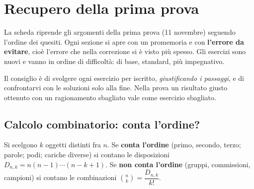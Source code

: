 \renewcommand{\thechapter}{R1}
\chapter{Recupero della prima prova}
\renewcommand{\thesection}{\arabic{section}}

\begin{vuoto}{}
La scheda riprende gli argomenti della prima prova (11 novembre) seguendo l'ordine dei quesiti. Ogni sezione si apre con un promemoria e con \textbf{l'errore da evitare}, cioè l'errore che nella correzione si è visto più spesso. Gli esercizi sono nuovi e vanno in ordine di difficoltà:  di base,  standard,  più impegnativo.

Il consiglio è di svolgere ogni esercizio per iscritto, \emph{giustificando i passaggi}, e di confrontarvi con le soluzioni solo alla fine. Nella prova un risultato giusto ottenuto con un ragionamento sbagliato vale come esercizio sbagliato.
\end{vuoto}

\section{Calcolo combinatorio: conta l'ordine?}

\begin{vuoto}[Promemoria]{}
Si scelgono $k$ oggetti distinti fra $n$. Se \textbf{conta l'ordine} (primo, secondo, terzo; parole; podi; cariche diverse) si contano le disposizioni $D_{n,k}=n(n-1)\cdots(n-k+1)$. Se \textbf{non conta l'ordine} (gruppi, commissioni, campioni) si contano le combinazioni $\binom nk=\dfrac{D_{n,k}}{k!}$.
\end{vuoto}

